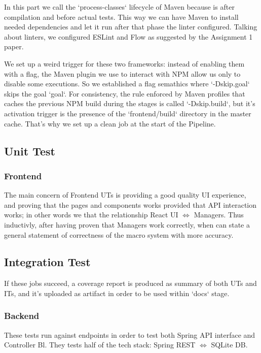 \documentclass[a4paper,10pt]{scrartcl}
\begin{document}
In this part we call the `process-classes` lifecycle of Maven because is after compilation and before actual tests. This way we can have Maven to install needed dependencies and let it run after that phase the linter configured. Talking about linters, we configured ESLint and Flow as suggested by the Assignment 1 paper.

We set up a weird trigger for these two frameworks: instead of enabling them with a flag, the Maven plugin we use to interact with NPM allow us only to disable some executions. So we established a flag semathics where `-Dskip.{goal}` skips the goal `goal`. For consistency, the rule enforced by Maven profiles that caches the previous NPM build during the stages is called `-Dskip.build`, but it's activation trigger is the presence of the `frontend/build` directory in the master cache. That's why we set up a clean job at the start of the Pipeline.

\subsection{Unit Test}

\subsubsection{Frontend}

The main concern of Frontend UTs is providing a good quality UI experience, and proving that the pages and components works provided that API interaction works; in other words we that the relationship React UI $\Leftrightarrow$ Managers. Thus inductivly, after having proven that Managers work correctly, when can state a general statement of correctness of the macro system with more accuracy.

\subsection{Integration Test}

If these jobs succeed, a coverage report is produced as summary of both UTs and ITs, and it's uploaded as artifact in order to be used within `docs` stage.

\subsubsection{Backend}

These tests run against endpoints in order to test both Spring API interface and Controller Bl. They tests half of the tech stack: Spring REST $\Leftrightarrow$ SQLite DB.
\end{document}
